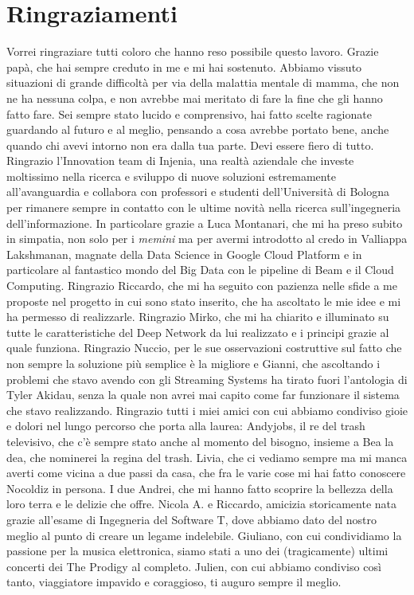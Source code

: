 \chapter*{Ringraziamenti}
\begin{small}
Vorrei ringraziare tutti coloro che hanno reso possibile questo lavoro.\newline
Grazie papà, che hai sempre creduto in me e mi hai sostenuto. Abbiamo vissuto situazioni di grande difficoltà per via della malattia mentale di mamma, che non ne ha nessuna colpa, e non avrebbe mai meritato di fare la fine che gli hanno fatto fare. Sei sempre stato lucido e comprensivo, hai fatto scelte ragionate guardando al futuro e al meglio, pensando a cosa avrebbe portato bene, anche quando chi avevi intorno non era dalla tua parte. Devi essere fiero di tutto. \newline
Ringrazio l'Innovation team di Injenia, una realtà aziendale che investe moltissimo nella ricerca e sviluppo di nuove soluzioni estremamente all'avanguardia e collabora con professori e studenti dell'Università di Bologna per rimanere sempre in contatto con le ultime novità nella ricerca sull'ingegneria dell'informazione. In particolare grazie a Luca Montanari, che mi ha preso subito in simpatia, non solo per i \textit{memini} ma per avermi introdotto al credo in Valliappa Lakshmanan, magnate della Data Science in Google Cloud Platform e in particolare al fantastico mondo del Big Data con le pipeline di Beam e il Cloud Computing. Ringrazio Riccardo, che mi ha seguito con pazienza nelle sfide a me proposte nel progetto in cui sono stato inserito, che ha ascoltato le mie idee e mi ha permesso di realizzarle. Ringrazio Mirko, che mi ha chiarito e illuminato su tutte le caratteristiche del Deep Network da lui realizzato e i principi grazie al quale funziona. Ringrazio Nuccio, per le sue osservazioni costruttive sul fatto che non sempre la soluzione più semplice è la migliore e Gianni, che ascoltando i problemi che stavo avendo con gli Streaming Systems ha tirato fuori l'antologia di Tyler Akidau, senza la quale non avrei mai capito come far funzionare il sistema che stavo realizzando.
\newline
Ringrazio tutti i miei amici con cui abbiamo condiviso gioie e dolori nel lungo percorso che porta alla laurea: Andyjobs, il re del trash televisivo, che c'è sempre stato anche al momento del bisogno, insieme a Bea la dea, che nominerei la regina del trash. Livia, che ci vediamo sempre ma mi manca averti come vicina a due passi da casa, che fra le varie cose mi hai fatto conoscere Nocoldiz in persona. I due Andrei, che mi hanno fatto scoprire la bellezza della loro terra e le delizie che offre. Nicola A. e Riccardo, amicizia storicamente nata grazie all'esame di Ingegneria del Software T, dove abbiamo dato del nostro meglio al punto di creare un legame indelebile. Giuliano, con cui condividiamo la passione per la musica elettronica, siamo stati a uno dei (tragicamente) ultimi concerti dei The Prodigy al completo. Julien, con cui abbiamo condiviso così tanto, viaggiatore impavido e coraggioso, ti auguro sempre il meglio.

\end{small}

